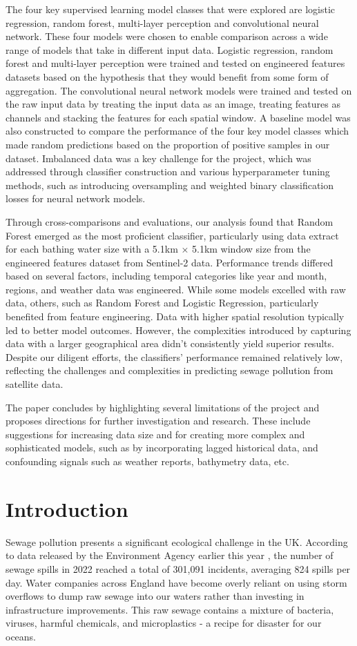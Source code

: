 \documentclass[a4paper,11pt]{report}
\begin{document}
The four key supervised learning model classes that were explored are logistic regression, random forest, multi-layer perception and convolutional neural network. These four models were chosen to enable comparison across a wide range of models that take in different input data. Logistic regression, random forest and multi-layer perception were trained and tested on engineered features datasets based on the hypothesis that they would benefit from some form of aggregation. The convolutional neural network models were trained and tested on the raw input data by treating the input data as an image, treating features as channels and stacking the features for each spatial window. A baseline model was also constructed to compare the performance of the four key model classes which made random predictions based on the proportion of positive samples in our dataset. Imbalanced data was a key challenge for the project, which was addressed through classifier construction and various hyperparameter tuning methods, such as introducing oversampling and weighted binary classification losses for neural network models. 

Through cross-comparisons and evaluations, our analysis found that Random Forest emerged as the most proficient classifier, particularly using data extract for each bathing water size with a 5.1km × 5.1km window size from the engineered features dataset from Sentinel-2 data. Performance trends differed based on several factors, including temporal categories like year and month, regions, and weather data was engineered. While some models excelled with raw data, others, such as Random Forest and Logistic Regression, particularly benefited from feature engineering. Data with higher spatial resolution typically led to better model outcomes. However, the complexities introduced by capturing data with a larger geographical area didn't consistently yield superior results. Despite our diligent efforts, the classifiers' performance remained relatively low, reflecting the challenges and complexities in predicting sewage pollution from satellite data. 

The paper concludes by highlighting several limitations of the project and proposes directions for further investigation and research. These include suggestions for increasing data size and for creating more complex and sophisticated models, such as by incorporating lagged historical data, and confounding signals such as weather reports, bathymetry data, etc. 


\chapter{Introduction}
\onehalfspacing
Sewage pollution presents a significant ecological challenge in the UK. According to data released by the Environment Agency earlier this year \citep{ea}, the number of sewage spills in 2022 reached a total of 301,091 incidents, averaging 824 spills per day. Water companies across England have become overly reliant on using storm overflows to dump raw sewage into our waters rather than investing in infrastructure improvements. This raw sewage contains a mixture of bacteria, viruses, harmful chemicals, and microplastics - a recipe for disaster for our oceans.
\end{document}
